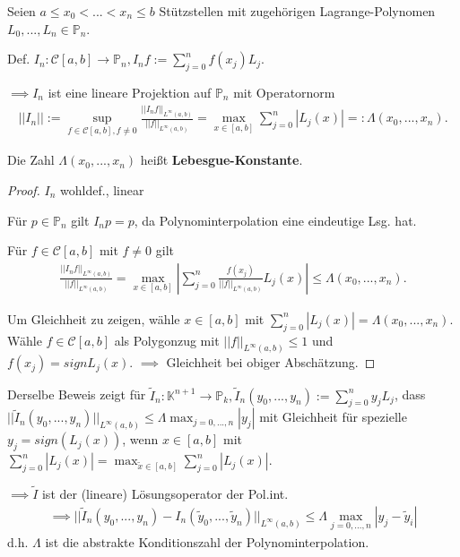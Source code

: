 \begin{theorem}
	Seien $a \leq x_0 < ... < x_n \leq b$ Stützstellen mit zugehörigen Lagrange-Polynomen $L_0, ..., L_n \in \mathbb{P}_n$.
	
	Def. $I_n : \mathcal{C}[a,b] \rightarrow \mathbb{P}_n, I_nf := \sum_{j=0}^{n} f(x_j) L_j$.
	
	$\implies I_n$ ist eine lineare Projektion auf $\mathbb{P}_n$ mit Operatornorm
	\begin{align*}
		||I_n|| := \sup_{f \in \mathcal{C}[a, b], f\neq 0} \frac{||I_nf||_{L^\infty(a,b)}}{||f||_{L^\infty(a,b)}} = \max_{x\in [a,b]} \sum_{j=0}^{n} |L_j(x)| =: \Lambda(x_0, ..., x_n).
	\end{align*}
	
	Die Zahl $\Lambda(x_0, ..., x_n)$ heißt \textbf{Lebesgue-Konstante}.
\end{theorem}

\begin{proof}
	$I_n$ wohldef., linear \checkmark
	
	Für $p \in \mathbb{P}_n$ gilt $I_np = p$, da Polynominterpolation eine eindeutige Lsg. hat.
	
	Für $f \in \mathcal{C}[a,b]$ mit $f\neq 0$ gilt
	\begin{align*}
		\frac{||I_nf||_{L^\infty(a,b)}}{||f||_{L^\infty(a,b)}} = \max_{x\in [a,b]} \left|\sum_{j=0}^{n} \frac{f(x_j)}{||f||_{L^\infty(a,b)}} L_j(x)\right| \leq \Lambda(x_0, ..., x_n).
	\end{align*}
	
	Um Gleichheit zu zeigen, wähle $x \in [a,b]$ mit $\sum_{j=0}^{n}|L_j(x)| = \Lambda(x_0, ..., x_n)$. Wähle $f \in \mathcal{C}[a, b]$ als Polygonzug mit $||f||_{L^\infty(a,b)} \leq 1$ und $f(x_j) = sign L_j(x)$. $\implies$ Gleichheit bei obiger Abschätzung.
\end{proof}

\begin{remark}
	Derselbe Beweis zeigt für $\tilde{I}_n: \mathbb{K}^{n+1} \rightarrow \mathbb{P}_k, \tilde{I}_n(y_0, ..., y_n) := \sum_{j=0}^{n} y_j L_j$, dass $||\tilde{I}_n(y_0, ..., y_n)||_{L^\infty(a,b)} \leq \Lambda \max_{j=0,...,n} |y_j|$ mit Gleichheit für spezielle $y_j = sign(L_j(x))$, wenn $x \in [a, b]$ mit $\sum_{j=0}^{n} |L_j(x)| = \max_{\tilde{x}\in [a,b]} \sum_{j=0}^{n} |L_j(x)|$.
	
	$\implies \tilde{I}$ ist der (lineare) Lösungsoperator der Pol.int.
	\begin{align*}
		\implies ||\tilde{I}_n(y_0, ..., y_n) - I_n(\tilde{y}_0, ..., \tilde{y}_n)||_{L^\infty(a,b)} \leq \Lambda \max_{j=0,...,n} |y_j - \tilde{y}_i|
	\end{align*}
	d.h. $\Lambda$ ist die abstrakte Konditionszahl der Polynominterpolation.
\end{remark}


